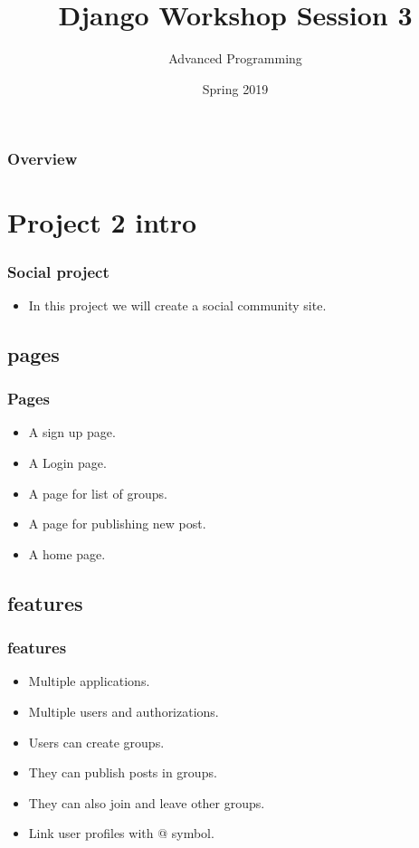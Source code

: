 \documentclass{beamer}
\title[Django Workshop]{Django Workshop Session 3} %
\author{Advanced Programming} %
\institute[AUT] %
{
	Amirkabir University of Technology\\ %
	\medskip
	\textit{} %
}
\date{Spring 2019} %
\begin{document}
	
	\begin{frame}
		\titlepage %
	\end{frame}

	\begin{frame}
	\frametitle{Overview} %
	\tableofcontents %
	\end{frame}


\section{Project 2 intro}
\begin{frame}
\frametitle{Social project}
	\begin{itemize}
		\centering
		\large
		\item In this project we will create a social community site.
	\end{itemize}
\end{frame}

\subsection{pages}
\begin{frame}
\frametitle{Pages}
\begin{itemize}
	\item A sign up page.
	\item A Login page.
	\item A page for list of groups.
	\item A page for publishing new post.
	\item A home page.
\end{itemize}
\end{frame}

\subsection{features}
\begin{frame}
	\frametitle{features}
	\begin{itemize}
		\item \color{green}Multiple applications.
		\color{black}
		\item Multiple users and authorizations.
		\item Users can create groups.
		\item They can publish posts in groups.
		\item They can also join and leave other groups.
		\item Link user profiles with @ symbol.
	\end{itemize}
\end{frame}
\end{document}

